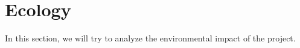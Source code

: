 
\clearpage{}
\section{Ecology}

In this section, we will try to analyze the environmental impact of the
project.\\


